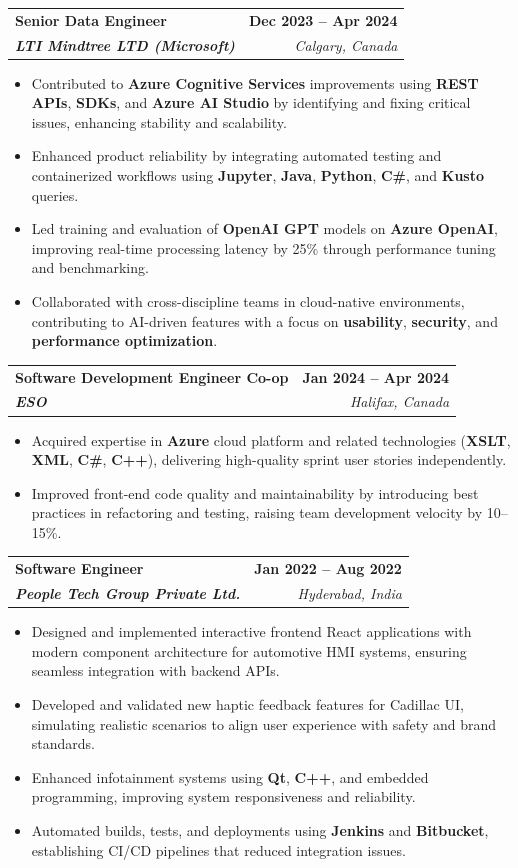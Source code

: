 \documentclass[letterpaper,11pt]{article}
\makeatletter
\newcommand{\resumeItem}[1]{
  \item\small{
    {#1 \vspace{-2pt}}
  }
}
\newcommand{\resumeSubheading}[4]{
  \vspace{-2pt}\item
    \begin{tabular*}{1.0\textwidth}[t]{l@{\extracolsep{\fill}}r}
      \textbf{#1} & \textbf{\small #2} \\
      \textit{\small#3} & \textit{\small #4} \\
    \end{tabular*}\vspace{-7pt}
}
\newcommand{\resumeItemListStart}{\begin{itemize}}
\newcommand{\resumeItemListEnd}{\end{itemize}\vspace{-5pt}}
\makeatother
\begin{document}
    \resumeSubheading
      {\textbf{Senior Data Engineer}}{\textbf{Dec 2023 -- Apr 2024}}
      {\textbf{LTI Mindtree LTD (Microsoft)}}{Calgary, Canada}
      \resumeItemListStart
        \resumeItem{Contributed to \textbf{Azure Cognitive Services} improvements using \textbf{REST APIs}, \textbf{SDKs}, and \textbf{Azure AI Studio} by identifying and fixing critical issues, enhancing stability and scalability.}
        \resumeItem{Enhanced product reliability by integrating automated testing and containerized workflows using \textbf{Jupyter}, \textbf{Java}, \textbf{Python}, \textbf{C\#}, and \textbf{Kusto} queries.}
        \resumeItem{Led training and evaluation of \textbf{OpenAI GPT} models on \textbf{Azure OpenAI}, improving real-time processing latency by 25\% through performance tuning and benchmarking.}
        \resumeItem{Collaborated with cross-discipline teams in cloud-native environments, contributing to AI-driven features with a focus on \textbf{usability}, \textbf{security}, and \textbf{performance optimization}.}
      \resumeItemListEnd
    
    \resumeSubheading
      {\textbf{Software Development Engineer Co-op}}{\textbf{Jan 2024 -- Apr 2024}}
      {\textbf{ESO}}{Halifax, Canada}
      \resumeItemListStart
        \resumeItem{Acquired expertise in \textbf{Azure} cloud platform and related technologies (\textbf{XSLT}, \textbf{XML}, \textbf{C\#}, \textbf{C++}), delivering high-quality sprint user stories independently.}
        \resumeItem{Improved front-end code quality and maintainability by introducing best practices in refactoring and testing, raising team development velocity by 10–15\%.}
      \resumeItemListEnd

    \resumeSubheading
      {\textbf{Software Engineer}}{\textbf{Jan 2022 -- Aug 2022}}
      {\textbf{People Tech Group Private Ltd.}}{Hyderabad, India}
      \resumeItemListStart
        \resumeItem{Designed and implemented interactive frontend React applications with modern component architecture for automotive HMI systems, ensuring seamless integration with backend APIs.}
        \resumeItem{Developed and validated new haptic feedback features for Cadillac UI, simulating realistic scenarios to align user experience with safety and brand standards.}
        \resumeItem{Enhanced infotainment systems using \textbf{Qt}, \textbf{C++}, and embedded programming, improving system responsiveness and reliability.}
        \resumeItem{Automated builds, tests, and deployments using \textbf{Jenkins} and \textbf{Bitbucket}, establishing CI/CD pipelines that reduced integration issues.}
      \resumeItemListEnd
\end{document}
